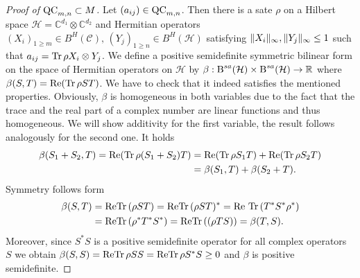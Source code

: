 \begin{proof}[Proof of $ \textup{QC}_{m,n} \subset M $]
	Let $ (a_{ij}) \in \textup{QC}_{m,n} $. Then there is a sate $ \rho $ on a Hilbert space $ \mathcal{H} = \mathbb{C}^{d_1} \otimes\mathbb{C}^{d_2} $ and Hermitian operators $ (X_i)_{1 \ge m} \in B^H(\mathcal{C}), \, (Y_j)_{1 \ge n} \in B^H(\mathcal{H}) $ satisfying $  \Vert {X_i} \Vert_{\infty},  \Vert {Y_j} \Vert_{\infty} \le 1 $ such that 
	$ a_{ij} = \text{Tr} \, {\rho X_i \otimes Y_j}  $.
	We define a positive semidefinite symmetric bilinear form on the space of Hermitian operators on $ \mathcal{H} $ by 
	$ \beta: \textup{B}^{sa}(\mathcal{H}) \times \textup{B}^{sa}(\mathcal{H}) \to \mathbb{R} $ where $ \beta(S,T) =\textup{Re}( \text{Tr} \, {\rho ST} ) $.
	We have to check that it indeed satisfies the mentioned properties. 
	Obviously, $ \beta $ is homogeneous in both variables due to the fact that the trace and the real part of a complex number are linear functions and thus homogeneous. We will show additivity for the first variable, the result follows analogously for the second one. It holds
	\begin{align*}
		\beta(S_1+S_2,T) = \textup{Re}(\text{Tr} \, {\rho(S_1+S_2)T} ) &= \textup{Re}(\text{Tr} \, {\rho S_1T} ) + \textup{Re}(\text{Tr} \, {\rho S_2T} ) \\
		&= \beta(S_1,T)+ \beta(S_2+T).
	\end{align*}
	Symmetry follows form 
	\begin{align*}
		\beta(S,T)&= \textup{Re}\text{Tr} \, {(\rho ST)}  =\textup{Re}\text{Tr} \, {(\rho ST)^*}   = \textup{Re \ensuremath{\text{Tr} \, {(T^*S^* \rho^*} })}  \\
		 &=\textup{Re} \text{Tr} \, {(\rho^* T^*S^*)}  = \textup{Re} \text{Tr} \, {((\rho T S))}  = \beta(T,S).
	\end{align*}
	Moreover, since $ S^*S $ is a positive semidefinite operator for all complex operators $ S $ we obtain $ \beta(S,S) = \textup{Re}\text{Tr} \, {\rho SS}  = \textup{Re} \text{Tr} \, {\rho S^*S}  \ge 0 $ and $ \beta $ is positive semidefinite. 
	

\end{proof}
